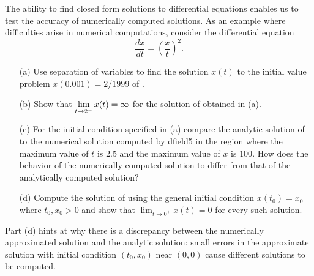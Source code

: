\documentclass{ximera}
\begin{document}
\begin{exercise} \label{c14.1.18}
The ability to find closed form solutions to differential equations enables
us to test the accuracy of numerically computed solutions.  As an example where difficulties arise in numerical computations, consider the differential 
equation
\begin{equation} \label{eq:exivp}
\frac{dx}{dt} = \left(\frac{x}{t}\right)^2.
\end{equation}
\begin{itemize}
\item[(a)] Use separation of variables to find the solution $x(t)$ to the 
initial value problem $x(0.001) = 2/1999$ of .
\item[(b)] Show that $\displaystyle\lim_{t\to 2^-}x(t)=\infty$ for the solution of 
 obtained in (a).
\item[(c)] For the initial condition specified in (a) compare the analytic 
solution of  to the numerical solution computed by {\sf dfield5} 
in the region where the maximum value of $t$ is $2.5$ and the maximum value of 
$x$ is $100$.  How does the behavior of the numerically computed solution 
to  differ from that of the analytically computed solution?
\item[(d)]  Compute the solution of  using the general initial 
condition $x(t_0) = x_0$ where $t_0,x_0>0$ and show that 
$\lim_{t\to 0^+}x(t)=0$ for every such solution. 
\end{itemize}
 Part (d) hints at why there is a discrepancy 
between the numerically approximated solution and the analytic solution: 
small errors in the approximate solution with initial condition $(t_0,x_0)$ 
near $(0,0)$ cause different solutions to be computed.
\end{exercise}

 
\end{document}
